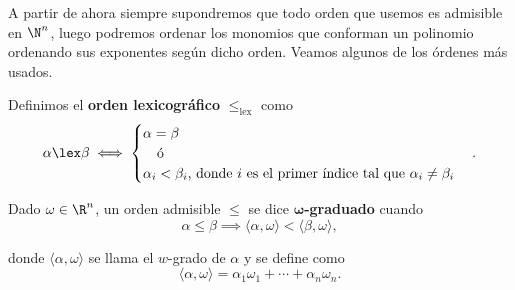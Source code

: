 A partir de ahora siempre supondremos que todo orden que usemos es admisible en $\N^n$, luego podremos ordenar los monomios que conforman un polinomio ordenando sus exponentes según dicho orden. Veamos algunos de los órdenes más usados. 

\begin{definicion}
    Definimos el \textbf{orden lexicográfico} $\le_{\text{lex}}$ como
    \begin{equation*}
        \alpha \lex \beta \iff \begin{cases}
            \alpha  = \beta \\
            \quad\text{ó}   \\
            \alpha_i < \beta_i \text{, donde $i$ es el primer índice tal que } \alpha_i \neq \beta_i
        \end{cases}.
    \end{equation*}
\end{definicion}


\begin{definicion}
    Dado $\omega\in \R^n$, un orden admisible $\le$ se dice \textbf{$\boldsymbol{\omega}$-graduado} cuando
    \begin{equation*}
        \alpha\le \beta \implies \langle \alpha, \omega\rangle  < \langle \beta, \omega\rangle,
    \end{equation*}
    
    donde $\langle \alpha, \omega\rangle$ se llama el $w$-grado de $\alpha$ y se define como
    \begin{equation}
        \langle \alpha, \omega\rangle = \alpha_1 \omega_1 + \cdots + \alpha_n \omega_n.
    \end{equation}
\end{definicion}

